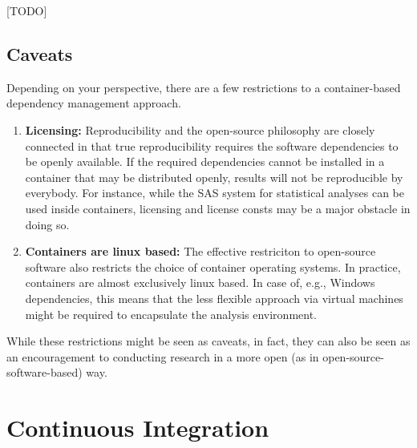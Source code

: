 \documentclass[]{book}
\providecommand{\tightlist}{%
  \setlength{\itemsep}{0pt}\setlength{\parskip}{0pt}}
\begin{document}
{[}TODO{]}

\section{Caveats}\label{caveats}

Depending on your perspective, there are a few restrictions to a
container-based dependency management approach.

\begin{enumerate}
\def\labelenumi{\arabic{enumi}.}
\tightlist
\item
  \textbf{Licensing:} Reproducibility and the open-source philosophy are
  closely connected in that true reproducibility requires the software
  dependencies to be openly available. If the required dependencies
  cannot be installed in a container that may be distributed openly,
  results will not be reproducible by everybody. For instance, while the
  SAS system for statistical analyses can be used inside containers,
  licensing and license consts may be a major obstacle in doing so.
\item
  \textbf{Containers are linux based:} The effective restriciton to
  open-source software also restricts the choice of container operating
  systems. In practice, containers are almost exclusively linux based.
  In case of, e.g., Windows dependencies, this means that the less
  flexible approach via virtual machines might be required to
  encapsulate the analysis environment.
\end{enumerate}

While these restrictions might be seen as caveats, in fact, they can
also be seen as an encouragement to conducting research in a more open
(as in open-source-software-based) way.

\chapter{Continuous Integration}\label{chptr-continuous-integration}


\end{document}
